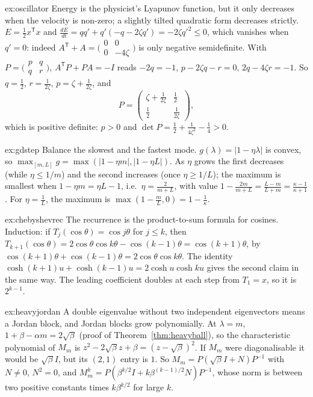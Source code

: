 \begin{solution}{ex:oscillator}
\idea Energy is the physicist's Lyapunov function, but it only decreases when the velocity is non-zero; a slightly tilted quadratic
form decreases strictly.
\writeup $E=\frac12x^{\mathsf T}x$ and $\frac{dE}{dt}=qq'+q'(-q-2\zeta q')=-2\zeta q'^2\le0$, which vanishes when $q'=0$: indeed $A^{\mathsf T}+A=
\bigl(\begin{smallmatrix}0&0\\0&-4\zeta\end{smallmatrix}\bigr)$ is only negative semidefinite. With $P=\bigl(\begin{smallmatrix}p&q\\q&r\end{smallmatrix}
\bigr)$, $A^{\mathsf T}P+PA=-I$ reads $-2q=-1$, $p-2\zeta q-r=0$, $2q-4\zeta r=-1$. So $q=\frac12$, $r=\frac1{2\zeta}$, $p=\zeta+\frac1{2\zeta}$, and
\[
P=\begin{pmatrix}\zeta+\frac1{2\zeta}&\frac12\\\frac12&\frac1{2\zeta}\end{pmatrix},
\]
which is positive definite: $p>0$ and $\det P=\frac12+\frac1{4\zeta^2}-\frac14>0$.
\end{solution}

\begin{solution}{ex:gdstep}
\idea Balance the slowest and the fastest mode.
\writeup $g(\lambda)=|1-\eta\lambda|$ is convex, so $\max_{[m,L]}g=\max(|1-\eta m|,|1-\eta L|)$. As $\eta$ grows the first decreases (while
$\eta\le1/m$) and the second increases (once $\eta\ge1/L$); the maximum is smallest when $1-\eta m=\eta L-1$, i.e.\ $\eta=\frac2{m+L}$, with
value $1-\frac{2m}{m+L}=\frac{L-m}{L+m}=\frac{\kappa-1}{\kappa+1}$. For $\eta=\frac1L$, the maximum is $\max(1-\frac mL,0)=1-\frac1\kappa$.
\end{solution}

\begin{solution}{ex:chebyshevrec}
\idea The recurrence is the product-to-sum formula for cosines.
\writeup Induction: if $T_j(\cos\theta)=\cos j\theta$ for $j\le k$, then $T_{k+1}(\cos\theta)=2\cos\theta\cos k\theta-\cos(k-1)\theta=\cos(k+1)\theta$, by
$\cos(k+1)\theta+\cos(k-1)\theta=2\cos\theta\cos k\theta$. The identity $\cosh(k+1)u+\cosh(k-1)u=2\cosh u\cosh ku$ gives the second claim in the same
way. The leading coefficient doubles at each step from $T_1=x$, so it is $2^{k-1}$.
\end{solution}

\begin{solution}{ex:heavyjordan}
\idea A double eigenvalue without two independent eigenvectors means a Jordan block, and Jordan blocks grow polynomially.
\writeup At $\lambda=m$, $1+\beta-\alpha m=2\sqrt\beta$ (proof of Theorem~\ref{thm:heavyball}), so the characteristic polynomial of $M_m$ is
$z^2-2\sqrt\beta z+\beta=(z-\sqrt\beta)^2$. If $M_m$ were diagonalisable it would be $\sqrt\beta I$, but its $(2,1)$ entry is $1$. So $M_m=
P(\sqrt\beta I+N)P^{-1}$ with $N\ne0$, $N^2=0$, and $M_m^k=P(\beta^{k/2}I+k\beta^{(k-1)/2}N)P^{-1}$, whose norm is between two positive
constants times $k\beta^{k/2}$ for large $k$.
\end{solution}

